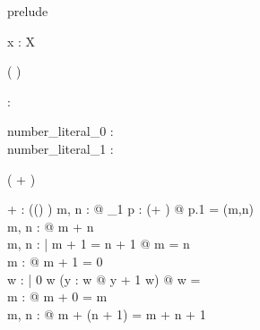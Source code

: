 \begin{zsection}
 \SECTION prelude
\end{zsection}

\begin{axdef}
  x : X
\end{axdef}

\begin{zed}
   ( \power \varg)
\end{zed}

\begin{zed}
  [\arithmos]
\end{zed}

\begin{axdef}
  \nat : \power \arithmos
\end{axdef}

\begin{axdef}
  number\_literal\_0 : \nat\\
  number\_literal\_1 : \nat
\end{axdef}

\begin{zed}
   \leftassoc ( \varg + \varg )
\end{zed}

\begin{axdef}
   \varg + \varg : \power ((\arithmos \cross \arithmos) \cross \arithmos)
\where
   \forall m, n : \nat @ \exists_1 p : (\varg + \varg) @ p.1 = (m,n)\\
   \forall m, n : \nat @ m + n \in \nat\\
   \forall m, n : \nat | m + 1 = n + 1 @ m = n\\
   \forall m : \nat @ \lnot m + 1 = 0\\
   \forall w : \power \nat | 0 \in w \land 
         (\forall y : w @ y + 1 \in w) @ w = \nat\\
   \forall m : \nat @ m + 0 = m\\
   \forall m, n : \nat @ m + (n + 1) = m + n + 1
\end{axdef}
